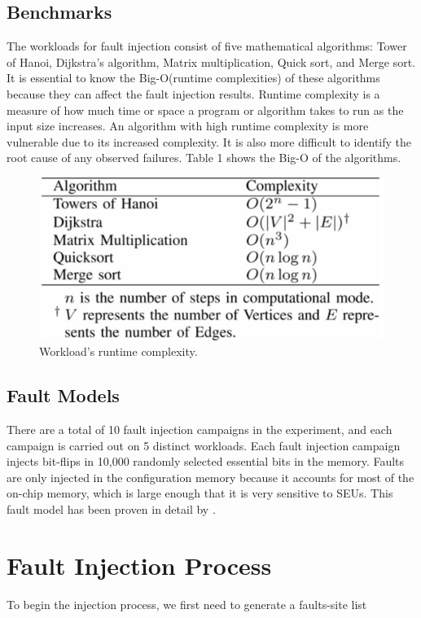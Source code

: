 \documentclass[conference]{IEEEtran}
\begin{document}
\subsection{Benchmarks}
The workloads for fault injection consist of five mathematical algorithms: Tower of Hanoi, Dijkstra's algorithm, Matrix multiplication, 
Quick sort, and Merge sort. It is essential to know the Big-O(runtime complexities) of these algorithms because they can affect the fault 
injection results. Runtime complexity is a measure of how much time or space a program or algorithm takes to run as the input size increases. 
An algorithm with high runtime complexity is more vulnerable due to its increased complexity. It is also more difficult to identify the 
root cause of any observed failures. Table 1 shows the Big-O of the algorithms. 
\begin{figure}[ht]
    \centering
    \includegraphics[scale = 0.17]{runtime.jpg}
    \caption{Workload's runtime complexity.}
\end{figure}
\subsection{Fault Models}
There are a total of 10 fault injection campaigns in the experiment, and each campaign is carried out on 5 distinct workloads. Each fault injection 
campaign injects bit-flips in 10,000 randomly selected essential bits in the memory. Faults are only injected in the configuration memory because
it accounts for most of the on-chip memory, which is large enough that it is very sensitive to SEUs. This fault model has been proven in detail
by \cite{b5}. 

\section{Fault Injection Process}
To begin the injection process, we first need to generate a faults-site list 
\end{document}
